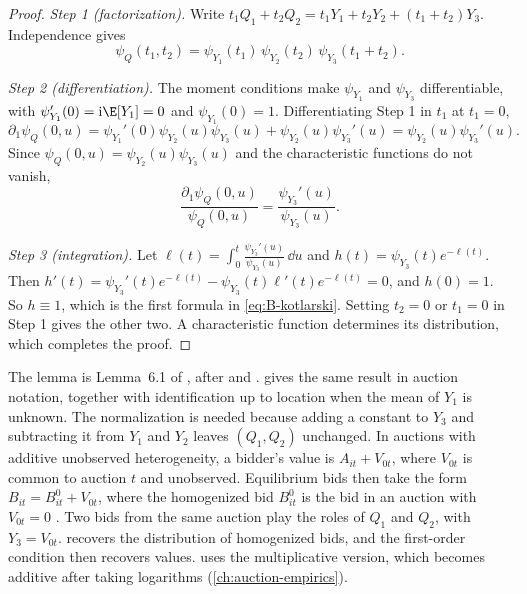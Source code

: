 \begin{proof}
\emph{Step 1 (factorization).} Write $t_1Q_1 + t_2Q_2 = t_1Y_1 + t_2Y_2 + (t_1 + t_2)Y_3$. Independence gives
\begin{equation*}
  \psi_Q(t_1, t_2) = \psi_{Y_1}(t_1)\,\psi_{Y_2}(t_2)\,\psi_{Y_3}(t_1 + t_2).
\end{equation*}

\emph{Step 2 (differentiation).} The moment conditions make $\psi_{Y_1}$ and $\psi_{Y_3}$ differentiable, with
$\psi_{Y_1}'(0) = \mathrm{i}\E[Y_1] = 0$ and $\psi_{Y_1}(0) = 1$. Differentiating Step 1 in $t_1$ at $t_1 = 0$,
\begin{equation*}
  \partial_1\psi_Q(0, u) = \psi_{Y_1}'(0)\psi_{Y_2}(u)\psi_{Y_3}(u) + \psi_{Y_2}(u)\psi_{Y_3}'(u)
  = \psi_{Y_2}(u)\psi_{Y_3}'(u).
\end{equation*}
Since $\psi_Q(0, u) = \psi_{Y_2}(u)\psi_{Y_3}(u)$ and the characteristic functions do not vanish,
\begin{equation*}
  \frac{\partial_1\psi_Q(0, u)}{\psi_Q(0, u)} = \frac{\psi_{Y_3}'(u)}{\psi_{Y_3}(u)}.
\end{equation*}

\emph{Step 3 (integration).} Let $\ell(t) = \int_0^t\frac{\psi_{Y_3}'(u)}{\psi_{Y_3}(u)}\,\dd u$ and $h(t) =
\psi_{Y_3}(t)e^{-\ell(t)}$. Then $h'(t) = \psi_{Y_3}'(t)e^{-\ell(t)} - \psi_{Y_3}(t)\ell'(t)e^{-\ell(t)} = 0$, and
$h(0) = 1$. So $h \equiv 1$, which is the first formula in \eqref{eq:B-kotlarski}. Setting $t_2 = 0$ or $t_1 =
0$ in Step 1 gives the other two. A characteristic function determines its distribution, which completes the
proof.
\end{proof}

The lemma is Lemma~6.1 of \citet{AtheyHaile2007}, after \citet{Kotlarski1966} and \citet{PrakasaRao1992}.
 gives the same result in auction notation, together with identification up to location
when the mean of $Y_1$ is unknown. The normalization is needed because adding a constant to $Y_3$ and subtracting it from $Y_1$ and $Y_2$ leaves
$(Q_1, Q_2)$ unchanged. In auctions with additive unobserved heterogeneity, a bidder's value is
$A_{it} + V_{0t}$, where $V_{0t}$ is common to auction $t$ and unobserved. Equilibrium bids then take the form
$B_{it} = B^0_{it} + V_{0t}$, where the homogenized bid $B^0_{it}$ is the bid in an auction with $V_{0t} = 0$
\citep[Section~6.1.2]{AtheyHaile2007}. Two bids from the same auction play the roles of $Q_1$ and $Q_2$, with
$Y_3 = V_{0t}$.  recovers the distribution of homogenized bids, and the first-order
condition then recovers values. \citet{Krasnokutskaya2011} uses the multiplicative version, which becomes
additive after taking logarithms (\cref{ch:auction-empirics}).

